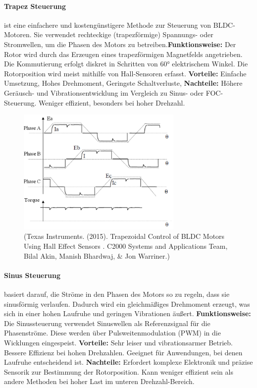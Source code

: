 \documentclass[paper=a4,11pt]{scrreprt}
\begin{document}
\paragraph{Trapez Steuerung} ist eine einfachere und kostengünstigere Methode zur Steuerung von BLDC-Motoren. Sie verwendet rechteckige (trapezförmige) Spannungs- oder Stromwellen, um die Phasen des Motors zu betreiben.\textbf{Funktionsweise:}
Der Rotor wird durch das Erzeugen eines trapezförmigen Magnetfelds angetrieben. Die Kommutierung erfolgt diskret in Schritten von 60° elektrischem Winkel. Die Rotorposition wird meist mithilfe von Hall-Sensoren erfasst. \textbf{Vorteile:}
Einfache Umsetzung, Hohes Drehmoment, Geringste Schaltverluste,
\textbf{Nachteile:} Höhere Geräusch- und Vibrationsentwicklung im Vergleich zu Sinus- oder FOC-Steuerung. Weniger effizient, besonders bei hoher Drehzahl.
\begin{figure}[ht]
\begin{center}
\includegraphics[width=8cm]{Bilder/trap.PNG}
\caption{(Texas Instruments. (2015). Trapezoidal Control of BLDC Motors Using Hall Effect Sensors . C2000 Systems and Applications Team, Bilal Akin, Manish Bhardwaj, \& Jon Warriner.)}
\label{trap}
\end{center}
\end{figure}
\paragraph{Sinus Steuerung} basiert darauf, die Ströme in den Phasen des Motors so zu regeln, dass sie sinusförmig verlaufen. Dadurch wird ein gleichmäßiges Drehmoment erzeugt, was sich in einer hohen Laufruhe und geringen Vibrationen äußert. \textbf{Funktionsweise:}
Die Sinussteuerung verwendet Sinuswellen als Referenzsignal für die Phasenströme. Diese werden über Pulsweitenmodulation (PWM) in die Wicklungen eingespeist. \textbf{Vorteile:} Sehr leiser und vibrationsarmer Betrieb. Bessere Effizienz bei hohen Drehzahlen. Geeignet für Anwendungen, bei denen Laufruhe entscheidend ist. \textbf{Nachteile:} Erfordert komplexe Elektronik und präzise Sensorik zur Bestimmung der Rotorposition. Kann weniger effizient sein als andere Methoden bei hoher Last im unteren Drehzahl-Bereich.
\end{document}
